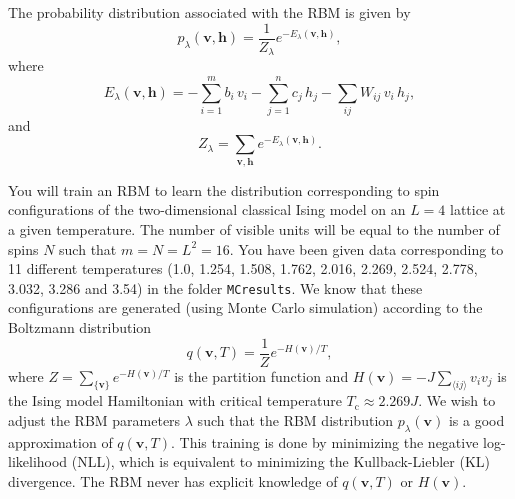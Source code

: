 \documentclass[letterpaper]{scrartcl}
\newcommand{\beq}{\begin{equation}}
\newcommand{\eeq}{\end{equation}}
\begin{document}
The probability distribution associated with the RBM is given by
\begin{equation*}
p_\lambda(\mathbf{v}, \mathbf{h}) = \frac{1}{Z_\lambda} e^{-E_\lambda (\mathbf{v}, \mathbf{h})},
\end{equation*}
where
\begin{equation*}
E_\lambda (\mathbf{v}, \mathbf{h}) = -\sum_{i=1}^m b_i \, v_i -\sum_{j=1}^n c_j\,  h_j - \sum_{ij} W_{ij} \, v_i \, h_j ,
\end{equation*}
and 
\begin{equation*}
Z_\lambda = \sum_{\mathbf{v}, \mathbf{h}} e^{-E_\lambda (\mathbf{v}, \mathbf{h})}.
\end{equation*}

You will train an RBM to learn the distribution corresponding to spin configurations of 
the two-dimensional classical Ising model on an $L=4$ lattice at a given temperature.
The number of visible units will be equal to the number of spins $N$ such that $m = N = L^2 = 16$.
You have been given data corresponding to 11 different temperatures (1.0, 1.254, 1.508, 1.762, 2.016, 2.269, 2.524, 2.778, 3.032, 3.286 and 3.54) in the folder \texttt{MC{\textunderscore}results}.
We know that these configurations are generated (using Monte Carlo simulation) according to the Boltzmann distribution
\beq
q(\mathbf{v},T) = \frac{1}{Z} e^{-H(\mathbf{v})/T}, 
\eeq
where $Z = \sum_{\{ \mathbf{v} \}}e^{-H(\mathbf{v})/T}$ is the partition function and $H(\mathbf{v}) = -J \sum_{\langle i j \rangle} v_i v_j$ is the Ising model Hamiltonian with critical temperature $T_\text{c} \approx 2.269 J$.
We wish to adjust the RBM parameters $\lambda$ such that the RBM distribution $p_\lambda(\mathbf{v})$ is a good approximation of $q(\mathbf{v},T)$.
This training is done by minimizing the negative log-likelihood (NLL), which is equivalent to minimizing the Kullback-Liebler (KL) divergence. 
The RBM never has explicit knowledge of $q(\mathbf{v},T)$ or $H(\mathbf{v})$.
\end{document}
